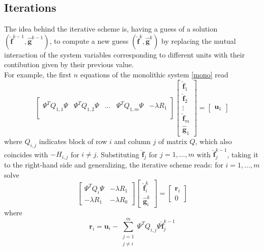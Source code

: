 \subsection{Iterations}
The idea behind the iterative scheme is, having a guess of a solution $(\hat{\mathbf{f}}^{k-1},\hat{\mathbf{g}}^{k-1})$, to compute a new guess $(\hat{\mathbf{f}}^k,\hat{\mathbf{g}}^k)$ by replacing the mutual interaction of the system variables corresponding to different units with their contibution given by their previous value.\\
For example, the first $n$ equations of the monolithic system \ref{mono} read
\begin{equation}
    \begin{bmatrix}
        \Psi^TQ_{1,1}\Psi & \Psi^TQ_{1,2}\Psi &\dots &\Psi^TQ_{1,m}\Psi & -\lambda R_1\\
    \end{bmatrix}
    \begin{bmatrix}
        \hat{\mathbf{f}}_1\\
        \hat{\mathbf{f}}_2\\
        \vdots\\
        \hat{\mathbf{f}}_m\\
        \hat{\mathbf{g}}_1    
    \end{bmatrix}
    =
    \begin{bmatrix}
        \mathbf{u}_1
    \end{bmatrix}
\end{equation}
where $Q_{i,j}$ indicates block of row $i$ and column $j$ of matrix $Q$, which also coincides with $-H_{i,j}$ for $i \neq j$.
Substituting $\hat{\mathbf{f}}_j$ for $j=1,\dots,m$ with $\hat{\mathbf{f}}_j^{k-1}$, taking it to the right-hand side and generalizing, the iterative scheme reads: for $i = 1, \dots, m$ solve
\begin{equation}
    \begin{bmatrix}
        \Psi^TQ_i\Psi & -\lambda R_1\\
        -\lambda R_1  & -\lambda R_0
    \end{bmatrix}
    \begin{bmatrix}
        \hat{\mathbf{f}}_i^k\\
        \hat{\mathbf{g}}_i^k
    \end{bmatrix}
    =
    \begin{bmatrix}
        \mathbf{r}_i\\
        0
    \end{bmatrix}
\end{equation}
where
\begin{equation}
     \mathbf{r}_i =\mathbf{u}_i -\sum_{\substack{j=1\\ j\neq i}}^m \Psi^TQ_{i,j} \Psi \hat{\mathbf{f}}_j^{k-1}
\end{equation}

